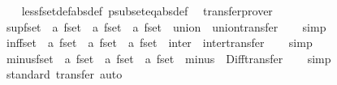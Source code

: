 \begin{isabellebody}
%
\isadelimproof
\ \ %
\endisadelimproof
%
\isatagproof
{}\isamarkupfalse%
\ less{\isacharunderscore}fset{\isacharunderscore}def{\isacharbrackleft}abs{\isacharunderscore}def{\isacharbrackright}\ psubset{\isacharunderscore}eq{\isacharbrackleft}abs{\isacharunderscore}def{\isacharbrackright}\ \isamarkupfalse%
\ transfer{\isacharunderscore}prover%
\endisatagproof
{\isafoldproof}%
%
\isadelimproof
\isanewline
%
\endisadelimproof
\isanewline
\isanewline
{}\isamarkupfalse%
\ sup{\isacharunderscore}fset\ {\isacharcolon}{\isacharcolon}\ {\isachardoublequoteopen}{\isacharprime}a\ fset\ {\isasymRightarrow}\ {\isacharprime}a\ fset\ {\isasymRightarrow}\ {\isacharprime}a\ fset{\isachardoublequoteclose}\ \ union\ \ union{\isacharunderscore}transfer\isanewline
%
\isadelimproof
\ \ %
\endisadelimproof
%
\isatagproof
{}\isamarkupfalse%
\ simp%
\endisatagproof
{\isafoldproof}%
%
\isadelimproof
\isanewline
%
\endisadelimproof
\isanewline
{}\isamarkupfalse%
\ inf{\isacharunderscore}fset\ {\isacharcolon}{\isacharcolon}\ {\isachardoublequoteopen}{\isacharprime}a\ fset\ {\isasymRightarrow}\ {\isacharprime}a\ fset\ {\isasymRightarrow}\ {\isacharprime}a\ fset{\isachardoublequoteclose}\ \ inter\ \ inter{\isacharunderscore}transfer\isanewline
%
\isadelimproof
\ \ %
\endisadelimproof
%
\isatagproof
{}\isamarkupfalse%
\ simp%
\endisatagproof
{\isafoldproof}%
%
\isadelimproof
\isanewline
%
\endisadelimproof
\isanewline
{}\isamarkupfalse%
\ minus{\isacharunderscore}fset\ {\isacharcolon}{\isacharcolon}\ {\isachardoublequoteopen}{\isacharprime}a\ fset\ {\isasymRightarrow}\ {\isacharprime}a\ fset\ {\isasymRightarrow}\ {\isacharprime}a\ fset{\isachardoublequoteclose}\ \ minus\ \ Diff{\isacharunderscore}transfer\isanewline
%
\isadelimproof
\ \ %
\endisadelimproof
%
\isatagproof
{}\isamarkupfalse%
\ simp%
\endisatagproof
{\isafoldproof}%
%
\isadelimproof
\isanewline
%
\endisadelimproof
\isanewline
{}\isamarkupfalse%
\isanewline
%
\isadelimproof
\ \ %
\endisadelimproof
%
\isatagproof
{}\isamarkupfalse%
\ {\isacharparenleft}standard{\isacharsemicolon}\ transfer{\isacharsemicolon}\ auto{\isacharparenright}{\isacharplus}%
\endisatagproof
{\isafoldproof}%
%
\isadelimproof
\isanewline
%
\endisadelimproof
\isanewline
{}\isamarkupfalse%

\end{isabellebody}

